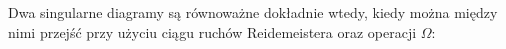 \begin{proposition}
    Dwa singularne diagramy są równoważne dokładnie wtedy, kiedy można między nimi przejść przy użyciu ciągu ruchów Reidemeistera oraz operacji $\Omega$:
\begin{comment}
    \[
    \begin{tikzpicture}[baseline=-0.65ex, scale=0.1]
    \begin{knot}[clip width=5, end tolerance=1pt, flip crossing/.list={1,2,3,4}]
        \strand[semithick] (-15, 5) to (0, 5) to (5, 0) to (0, -5) to (-15, -5);
        \strand[semithick] (-2, -2) to (-10, -10);
        \strand[semithick] (-2, 2) to (-10, 10);
        \strand[semithick] (2, -2) to (10, -10);
        \strand[semithick] (2, 2) to (10, 10);
        \draw[semithick] (2, 2) to (-2, -2);
        \draw[semithick] (2, -2) to (-2, 2);
        \draw[black,fill=black] (0,0) circle (.5);
    \end{knot}
    \end{tikzpicture}
    \quad\cong_\Omega\quad
    \begin{tikzpicture}[baseline=-0.65ex, scale=0.1]
    \begin{knot}[clip width=5, end tolerance=1pt, flip crossing/.list={1,2,3,4}]
        \strand[semithick] (-15, 5) to (-10, 5) to (-5, 0) to (-10, -5) to (-15, -5);
        \strand[semithick] (-2, -2) to (-10, -10);
        \strand[semithick] (-2, 2) to (-10, 10);
        \strand[semithick] (2, -2) to (10, -10);
        \strand[semithick] (2, 2) to (10, 10);
        \draw[semithick] (2, 2) to (-2, -2);
        \draw[semithick] (2, -2) to (-2, 2);
        \draw[black,fill=black] (0,0) circle (.5);
    \end{knot}
    \end{tikzpicture}
    \quad\cong_\Omega\quad
    \begin{tikzpicture}[baseline=-0.65ex, scale=0.1]
    \begin{knot}[clip width=5, end tolerance=1pt]
        \strand[semithick] (-15, 5) to (0, 5) to (5, 0) to (0, -5) to (-15, -5);
        \strand[semithick] (-2, -2) to (-10, -10);
        \strand[semithick] (-2, 2) to (-10, 10);
        \strand[semithick] (2, -2) to (10, -10);
        \strand[semithick] (2, 2) to (10, 10);
        \draw[semithick] (2, 2) to (-2, -2);
        \draw[semithick] (2, -2) to (-2, 2);
        \draw[black,fill=black] (0,0) circle (.5);
    \end{knot}
    \end{tikzpicture}
    \]
\end{comment}
\end{proposition}

